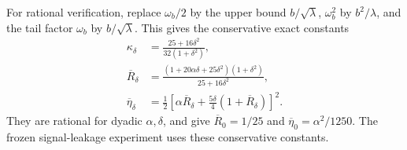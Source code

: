 For rational verification, replace $\omega_b/2$ by the upper bound $b/\sqrt\lambda$, $\omega_b^2$ by $b^2/\lambda$, and the tail factor $\omega_b$ by $b/\sqrt\lambda$. This gives the conservative exact constants
\begin{align}
 \kappa_\delta&=\frac{25+16\delta^2}{32(1+\delta^2)},\nonumber\\
 \overline R_\delta&=
 \frac{(1+20\alpha\delta+25\delta^2)(1+\delta^2)}{25+16\delta^2},
 \label{eq:leakage-rational-radius-v79}\\
 \overline\eta_\delta&=
 \frac12\left[\alpha\overline R_\delta+
 \frac{5\delta}{4}(1+\overline R_\delta)\right]^2.
 \label{eq:leakage-rational-tail-v79}
\end{align}
They are rational for dyadic $\alpha,\delta$, and give
$\overline R_0=1/25$ and $\overline\eta_0=\alpha^2/1250$.
The frozen signal-leakage experiment uses these conservative constants.
